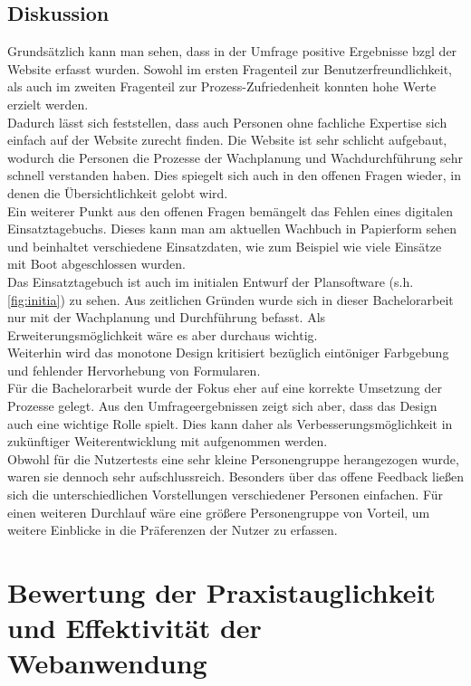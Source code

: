 \documentclass[fontsize=12pt,openright,oneside,paper=a4,BCOR=1cm]{scrbook}
\begin{document}
\subsection{Diskussion}
Grundsätzlich kann man sehen, dass in der Umfrage positive Ergebnisse bzgl der Website erfasst wurden. Sowohl im ersten Fragenteil zur Benutzerfreundlichkeit, als auch im zweiten Fragenteil zur Prozess-Zufriedenheit konnten hohe Werte erzielt werden. \\  
Dadurch lässt sich feststellen, dass auch Personen ohne fachliche Expertise sich einfach auf der Website zurecht finden. Die Website ist sehr schlicht aufgebaut, wodurch die Personen die Prozesse der Wachplanung und Wachdurchführung sehr schnell verstanden haben. Dies spiegelt sich auch in den offenen Fragen wieder, in denen die Übersichtlichkeit gelobt wird. \\ 
Ein weiterer Punkt aus den offenen Fragen bemängelt das Fehlen eines digitalen Einsatztagebuchs. Dieses kann man am aktuellen Wachbuch in Papierform sehen und beinhaltet verschiedene Einsatzdaten, wie zum Beispiel wie viele Einsätze mit Boot abgeschlossen wurden. \\
Das Einsatztagebuch ist auch im initialen Entwurf der Plansoftware (s.h. \ref{fig:initia}) zu sehen. Aus zeitlichen Gründen wurde sich in dieser Bachelorarbeit nur mit der Wachplanung und Durchführung befasst. Als Erweiterungsmöglichkeit wäre es aber durchaus wichtig. \\
Weiterhin wird das monotone Design kritisiert bezüglich eintöniger Farbgebung und fehlender Hervorhebung von Formularen. \\
Für die Bachelorarbeit wurde der Fokus eher auf eine korrekte Umsetzung der Prozesse gelegt.  Aus den Umfrageergebnissen zeigt sich aber, dass das Design auch eine wichtige Rolle spielt. Dies kann daher als Verbesserungsmöglichkeit in zukünftiger Weiterentwicklung mit aufgenommen werden. \\

Obwohl für die Nutzertests eine sehr kleine Personengruppe herangezogen wurde, waren sie dennoch sehr aufschlussreich. Besonders über das offene Feedback ließen sich die unterschiedlichen Vorstellungen verschiedener Personen einfachen. Für einen weiteren Durchlauf wäre eine größere Personengruppe von Vorteil, um weitere Einblicke in die Präferenzen der Nutzer zu erfassen.

\section{Bewertung der Praxistauglichkeit und Effektivität der Webanwendung}
\end{document}
